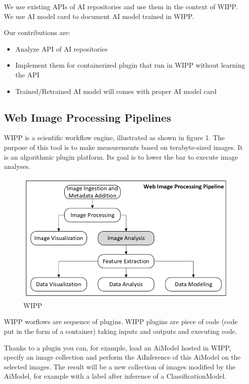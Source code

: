 We use existing APIs of AI repositories and use them in the context of WIPP. We
use AI model card to document AI model trained in WIPP.

Our contributions are:
\begin{itemize}
  \item Analyze API of AI repositories
  \item Implement them for containerized plugin that run in WIPP without learning the API
  \item Trained/Retrained AI model will comes with proper AI model card
\end{itemize}

\subsection{Web Image Processing Pipelines}

WIPP is a scientific workflow engine, illustrated as shown in figure 1.
The purpose of this tool is to make measurements based on terabyte-sized images.
It is an algorithmic plugin platform. Its goal is to lower the bar to execute
image analyses.

\begin{figure}[H]
  \centering
  \includegraphics[width=1.0\linewidth]{png/methods/wipp.png}
  \caption{\Gls{WIPP}}
  \label{fig:1wipp}
\end{figure}

WIPP worflows are sequence of plugins. WIPP plugins are piece of code (code put
in the form of a container) taking inputs and outputs and executing code.

Thanks to a plugin you can, for example, load an \Gls{AiModel} hosted in
\Gls{WIPP}, specify an
image collection and perform the \Gls{AiInference} of this \Gls{AiModel} on the
selected images.
The result will be a new collection of images modified by the \Gls{AiModel}, for
example
with a label after inference of a \Gls{ClassificationModel}.

